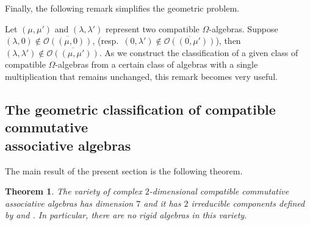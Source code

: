 \documentclass[pdftex]{sigma}
\numberwithin{equation}{section}
\newtheorem{Theorem}{Theorem}[section]
\begin{document}
Finally, the following remark simplifies the geometric problem.

\begin{Remark}\label{remrem}
 Let $(\mu, \mu')$ and $(\lambda, \lambda')$ represent two compatible $\Omega$-algebras. Suppose $(\lambda, 0)\not\in\overline{{\mathcal O}((\mu, 0))}$, (resp.\ $(0, \lambda')\not\in\overline{{\mathcal O}((0, \mu'))}$), then $(\lambda, \lambda')\not\in\overline{{\mathcal O}((\mu, \mu'))}$.
 As we construct the classification of a given class of compatible $\Omega$-algebras from a certain class of algebras with a single multiplication that remains unchanged, this remark becomes very useful.
\end{Remark}

\subsection[The geometric classification of compatible commutative associative algebras]{The geometric classification of compatible commutative\\ associative algebras}
The main result of the present section is the following theorem.

\begin{Theorem}\label{geo2}
The variety of complex $2$-dimensional compatible commutative associative algebras has
dimension $7$ and it has $2$ irreducible components defined by
 and
.
In particular, there are no rigid algebras in this variety.
\end{Theorem}
\end{document}
